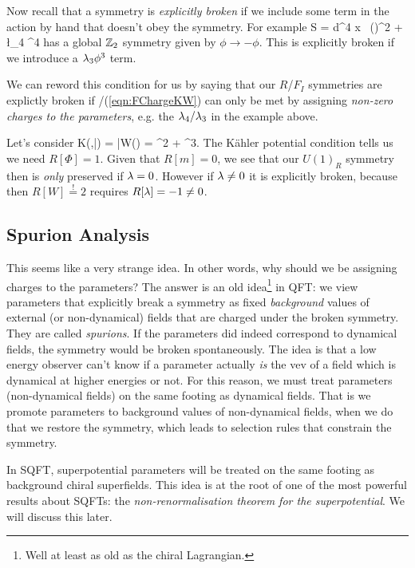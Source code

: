Now recall that a symmetry is \textit{explicitly broken} if we include some term in the action by hand that doesn't obey the symmetry. For example 
\bse 
    S = \int d^4 x \, (\p\phi)^2 + \l_4 \phi^4
\ese 
has a global $\mathbb{Z}_2$ symmetry given by $\phi\to-\phi$. This is explicitly broken if we introduce a $\lambda_3\phi^3$ term. 

We can reword this condition for us by saying that our $R$/$F_I$ symmetries are explictly broken if /(\ref{eqn:FChargeKW}) can only be met by assigning \textit{non-zero charges to the parameters}, e.g. the $\lambda_4/\lambda_3$ in the example above. 

\bex
    Let's consider 
    \bse 
        K(\Phi,\bar{\Phi}) = \bar{\Phi}\Phi \qand W(\Phi) = \Phi^2 +  \Phi^3.
    \ese 
    The K\"{a}hler potential condition tells us we need $R[\Phi]=1$. Given that $R[m]=0$, we see that our $U(1)_R$ symmetry then is \textit{only} preserved if $\lambda=0$. However if $\lambda\neq 0$ it is explicitly broken, because then $R[W] \overset{!}{=} 2$ requires $R[\lambda]=-1 \neq 0$. 
\eex 

\subsection{Spurion Analysis}

This seems like a very strange idea. In other words, why should we be assigning charges to the parameters? The answer is an old idea\footnote{Well at least as old as the chiral Lagrangian.} in QFT: we view parameters that explicitly break a symmetry as fixed \textit{background} values of external (or non-dynamical) fields that are charged under the broken symmetry. They are called \textit{spurions}. If the parameters did indeed correspond to dynamical fields, the symmetry would be broken spontaneously. The idea is that a low energy observer can't know if a parameter actually \textit{is} the vev of a field which is dynamical at higher energies or not. For this reason, we must treat parameters (non-dynamical fields) on the same footing as dynamical fields. That is we promote parameters to background values of non-dynamical fields, when we do that we restore the symmetry, which leads to selection rules that constrain the symmetry.

In SQFT, superpotential parameters will be treated on the same footing as background chiral superfields. This idea is at the root of one of the most powerful results about SQFTs: the \textit{non-renormalisation theorem for the superpotential}. We will discuss this later. 

